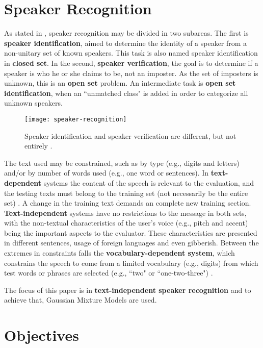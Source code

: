 \section{Speaker Recognition}
\label{sec:speaker-recognition}

As stated in , speaker recognition may be divided in two subareas. The first is \textbf{speaker identification}, aimed to determine the identity of a speaker from a non-unitary set of known speakers. This task is also named speaker identification in \textbf{closed set}. In the second, \textbf{speaker verification}, the goal is to determine if a speaker is who he or she claims to be, not an imposter. As the set of imposters is unknown, this is an \textbf{open set} problem. An intermediate task is \textbf{open set identification}, when an ``unmatched class" is added in order to categorize all unknown speakers.

\begin{figure}[ht]
    \centering
    \texttt{[image: speaker-recognition]}
    \caption{Speaker identification and speaker verification are different, but not entirely .}
    \label{fig:speaker-recognition}
\end{figure}

The text used may be constrained, such as by type (e.g., digits and letters) and/or by number of words used (e.g., one word or sentences). In \textbf{text-dependent} systems the content of the speech is relevant to the evaluation, and the testing texts must belong to the training set (not necessarily be the entire set) . A change in the training text demands an complete new training section. \textbf{Text-independent} systems have no restrictions to the message in both sets, with the non-textual characteristics of the user's voice (e.g., pitch and accent) being the important aspects to the evaluator. These characteristics are presented in different sentences, usage of foreign languages and even gibberish. Between the extremes in constraints falls the \textbf{vocabulary-dependent system}, which constrains the speech to come from a limited vocabulary (e.g., digits) from which test words or phrases are selected (e.g., ``two" or ``one-two-three") .

The focus of this paper is in \textbf{text-independent speaker recognition} and to achieve that, Gaussian Mixture Models are used.

\section{Objectives}

